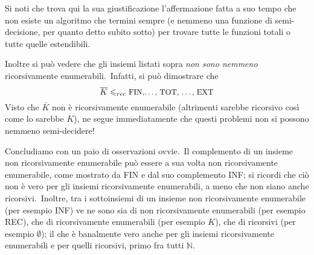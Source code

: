 \noindent Si noti che trova qui la sua giustificazione l'affermazione fatta a suo tempo che non esiste un algoritmo che termini sempre (e nemmeno una funzione di semi-decisione, per quanto detto subito sotto) per trovare tutte le funzioni totali o tutte quelle estendibili.

Inoltre si può vedere che gli insiemi listati sopra \textit{non sono nemmeno} ricorsivamente enumerabili.\
Infatti, si può dimostrare che
\[\overline{K} \leqslant_{rec}\mbox{\small FIN,\dots, TOT, \dots, EXT}\]
Visto che $\overline{K}$ non è ricorsivamente enumerabile (altrimenti sarebbe ricorsivo così come lo sarebbe $K$), ne segue immediatamente che questi problemi non si possono nemmeno semi-decidere!

Concludiamo con un paio di osservazioni ovvie.\
Il complemento di un insieme non ricorsivamente enumerabile può essere a sua volta non ricorsivamente enumerabile, come mostrato da {\footnotesize FIN} e dal suo complemento {\footnotesize INF}; si ricordi che ciò non è vero per gli insiemi ricorsivamente enumerabili, a meno che non siano anche ricorsivi.\
Inoltre, tra i sottoinsiemi di un insieme non ricorsivamente enumerabile (per esempio {\footnotesize INF}) ve ne sono sia di non ricorsivamente enumerabili (per esempio {\footnotesize REC}), che di ricorsivamente enumerabili (per esempio $K$), che di ricorsivi (per esempio $\emptyset$); il che è banalmente vero anche per gli insiemi ricorsivamente enumerabili e per quelli ricorsivi, primo fra tutti $\mathbb{N}$.
